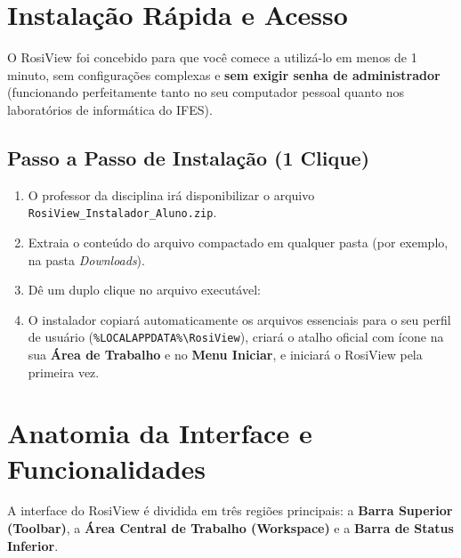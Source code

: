 \documentclass[11pt,a4paper]{article}
\begin{document}
\section{Instalação Rápida e Acesso}

O RosiView foi concebido para que você comece a utilizá-lo em menos de 1 minuto, sem configurações complexas e \textbf{sem exigir senha de administrador} (funcionando perfeitamente tanto no seu computador pessoal quanto nos laboratórios de informática do IFES).

\subsection{Passo a Passo de Instalação (1 Clique)}
\begin{enumerate}
    \item O professor da disciplina irá disponibilizar o arquivo \texttt{RosiView\_Instalador\_Aluno.zip}.
    \item Extraia o conteúdo do arquivo compactado em qualquer pasta (por exemplo, na pasta \textit{Downloads}).
    \item Dê um duplo clique no arquivo executável:
    \begin{center}
    \end{center}
    \item O instalador copiará automaticamente os arquivos essenciais para o seu perfil de usuário (\texttt{\%LOCALAPPDATA\%\textbackslash RosiView}), criará o atalho oficial com ícone na sua \textbf{Área de Trabalho} e no \textbf{Menu Iniciar}, e iniciará o RosiView pela primeira vez.
\end{enumerate}

\section{Anatomia da Interface e Funcionalidades}

A interface do RosiView é dividida em três regiões principais: a \textbf{Barra Superior (Toolbar)}, a \textbf{Área Central de Trabalho (Workspace)} e a \textbf{Barra de Status Inferior}.
\end{document}
